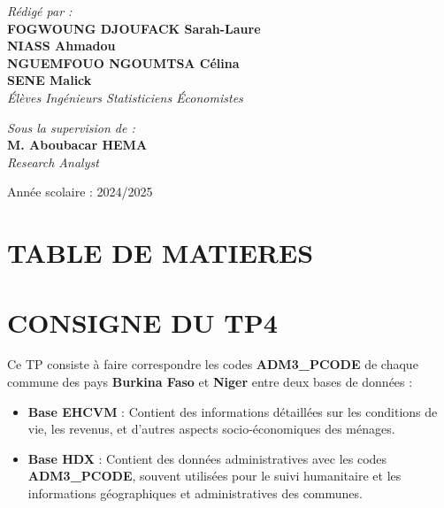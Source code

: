 \documentclass[
]{article}
\providecommand{\tightlist}{%
  \setlength{\itemsep}{0pt}\setlength{\parskip}{0pt}}
\begin{document}
\begin{titlepage}
\begin{center}
        \vfill  
        
        \begin{minipage}{0.5\textwidth}
    \begin{flushleft} \large
        \emph{\textsf{Rédigé par :}}\\
        \textbf{FOGWOUNG DJOUFACK Sarah-Laure}\\
        \textbf{NIASS Ahmadou}\\
        \textbf{NGUEMFOUO NGOUMTSA Célina}\\
        \textbf{SENE Malick}\\
        \textit{Élèves Ingénieurs Statisticiens Économistes}
    \end{flushleft}
\end{minipage}
        \hfill
        \begin{minipage}{0.4\textwidth}
            \begin{flushright} \large
                \emph{\textsf{Sous la supervision de :}} \\
                \textbf{M. Aboubacar HEMA}\\
                \textit{Research Analyst }
            \end{flushright}
        \end{minipage}

        \vfill

        {\large \textsf{Année scolaire : 2024/2025}}\\[0.5cm]
        
    \end{center}
\end{titlepage}

\section*{\centering \Huge TABLE DE MATIERES}
\tableofcontents

\newpage
{}
\section*{\centering \Huge CONSIGNE DU TP4}

Ce TP consiste à faire correspondre les codes \textbf{ADM3\_PCODE} de
chaque commune des pays \textbf{Burkina Faso} et \textbf{Niger} entre
deux bases de données :

\begin{itemize}
\tightlist
\item
  \textbf{Base EHCVM} : Contient des informations détaillées sur les
  conditions de vie, les revenus, et d'autres aspects socio-économiques
  des ménages.
\item
  \textbf{Base HDX} : Contient des données administratives avec les
  codes \textbf{ADM3\_PCODE}, souvent utilisées pour le suivi
  humanitaire et les informations géographiques et administratives des
  communes.
\end{itemize}
\end{document}
